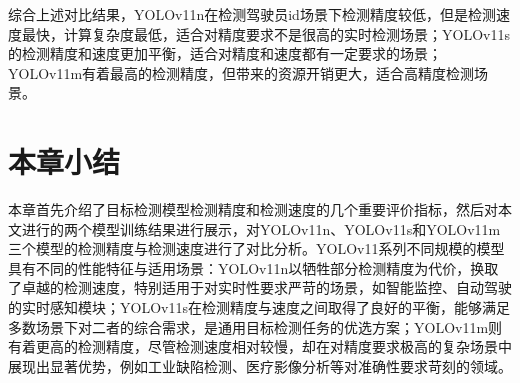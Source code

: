 综合上述对比结果，YOLOv11n在检测驾驶员id场景下检测精度较低，但是检测速度最快，计算复杂度最低，适合对精度要求不是很高的实时检测场景；YOLOv11s的检测精度和速度更加平衡，适合对精度和速度都有一定要求的场景；YOLOv11m有着最高的检测精度，但带来的资源开销更大，适合高精度检测场景。

\section{本章小结}
本章首先介绍了目标检测模型检测精度和检测速度的几个重要评价指标，然后对本文进行的两个模型训练结果进行展示，对YOLOv11n、YOLOv11s和YOLOv11m三个模型的检测精度与检测速度进行了对比分析。YOLOv11系列不同规模的模型具有不同的性能特征与适用场景：YOLOv11n以牺牲部分检测精度为代价，换取了卓越的检测速度，特别适用于对实时性要求严苛的场景，如智能监控、自动驾驶的实时感知模块；YOLOv11s在检测精度与速度之间取得了良好的平衡，能够满足多数场景下对二者的综合需求，是通用目标检测任务的优选方案；YOLOv11m则有着更高的检测精度，尽管检测速度相对较慢，却在对精度要求极高的复杂场景中展现出显著优势，例如工业缺陷检测、医疗影像分析等对准确性要求苛刻的领域。







